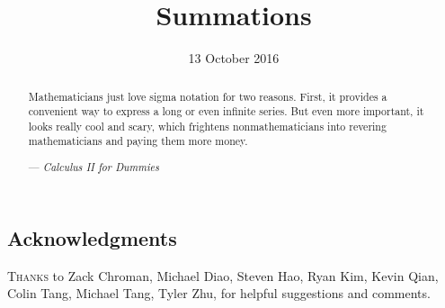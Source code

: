 \documentclass[11pt]{scrartcl}
\begin{document}
\title{Summations}
\date{13 October 2016}
\maketitle

\begin{abstract}
  \sffamily\small
  Mathematicians just love sigma notation for two reasons.
  First, it provides a convenient way to express a long or even infinite series.
  But even more important, it looks really cool and scary,
  which frightens nonmathematicians into revering mathematicians
  and paying them more money.

  \medskip

  --- \emph{Calculus II for Dummies} %
\end{abstract}
\subsection*{Acknowledgments}
\textsc{Thanks} to Zack Chroman, Michael Diao,
Steven Hao, Ryan Kim, Kevin Qian, Colin Tang, Michael Tang, Tyler Zhu,
for helpful suggestions and comments.

\tableofcontents
\eject
\end{document}
